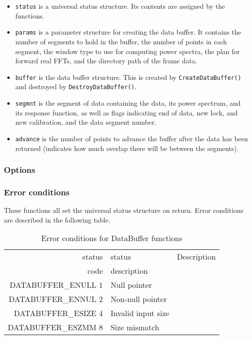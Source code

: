 \documentclass{article}
\begin{document}
\begin{itemize}
\item \texttt{status} is a universal status structure.  Its contents are
assigned by the functions.
\item \texttt{params} is a parameter structure for creating the data buffer.
It contains the number of segments to hold in the buffer, the number of points
in each segment, the window type to use for computing power spectra, the plan
for forward real FFTs, and the directory path of the frame data.
\item \texttt{buffer} is the data buffer structure.  This is created by
\texttt{CreateDataBuffer()} and destroyed by \texttt{DestroyDataBuffer()}.
\item \texttt{segmnt} is the segment of data containing the data, its power
spectrum, and its response function, as well as flags indicating end of data,
new lock, and new calibration, and the data segment number.
\item \texttt{advance} is the number of points to advance the buffer after the
data has been returned (indicates how much overlap there will be between the
segments).
\end{itemize}


\subsubsection{Options}

\subsubsection{Error conditions}

These functions all set the universal status structure on return.
Error conditions are described in the following table.

\begin{table}
\begin{tabular}{|r|l|p{2in}|}\hline
status  & status          & Description\\
code    & description     & \\\hline
DATABUFFER\_ENULL 1 & Null pointer & \\
DATABUFFER\_ENNUL 2 & Non-null pointer & \\
DATABUFFER\_ESIZE 4 & Invalid input size & \\
DATABUFFER\_ESZMM 8 & Size mismatch & \\
\hline
\end{tabular}
\caption{Error conditions for DataBuffer functions}\label{tbl:CV}
\end{table}
\end{document}
